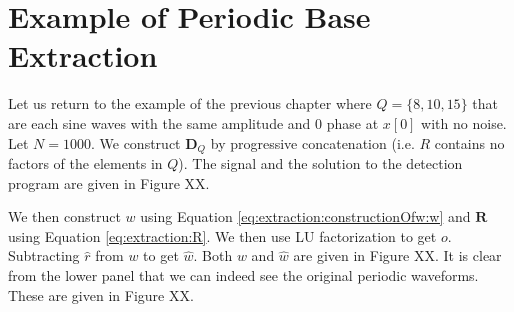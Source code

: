 %
%
%

\section{Example of Periodic Base Extraction}
Let us return to the example of the previous chapter where $Q = \{8, 10, 15\}$ that are each sine waves with the same amplitude and 0 phase at $x[0]$ with no noise. Let $N = 1000$. We construct $\bm{D}_Q$ by progressive concatenation (i.e. $R$ contains no factors of the elements in $Q$). The signal and the solution to the detection program are given in Figure XX.


We then construct $w$ using Equation \eqref{eq:extraction:constructionOfw:w} and $\bm{R}$ using Equation \eqref{eq:extraction:R}. We then use LU factorization to get $o$. Subtracting $\hat{r}$ from $w$ to get $\hat{w}$. Both $w$ and $\hat{w}$ are given in Figure XX. It is clear from the lower panel that we can indeed see the original periodic waveforms. These are given in Figure XX.
